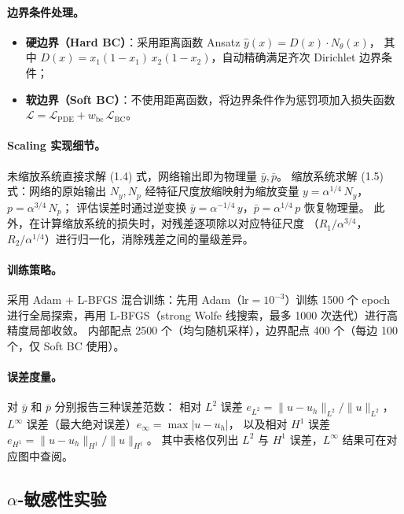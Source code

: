 \paragraph{边界条件处理。}
\begin{itemize}
  \item \textbf{硬边界（Hard BC）}：采用距离函数 Ansatz
        $\hat{y}(x) = D(x)\cdot N_\theta(x)$，
        其中 $D(x) = x_1(1-x_1)\,x_2(1-x_2)$，自动精确满足齐次 Dirichlet 边界条件；
  \item \textbf{软边界（Soft BC）}：不使用距离函数，将边界条件作为惩罚项加入损失函数
        $\mathcal{L} = \mathcal{L}_{\mathrm{PDE}} + w_{\mathrm{bc}}\,\mathcal{L}_{\mathrm{BC}}$。
\end{itemize}

\paragraph{Scaling 实现细节。}
未缩放系统直接求解 (1.4) 式，网络输出即为物理量 $\bar{y},\bar{p}$。
缩放系统求解 (1.5) 式：网络的原始输出 $N_y, N_p$ 经特征尺度放缩映射为缩放变量
$y = \alpha^{1/4}\,N_y$，$p = \alpha^{3/4}\,N_p$；
评估误差时通过逆变换 $\bar{y} = \alpha^{-1/4}\,y$，$\bar{p} = \alpha^{1/4}\,p$
恢复物理量。
此外，在计算缩放系统的损失时，对残差逐项除以对应特征尺度
（$R_1/\alpha^{3/4}$，$R_2/\alpha^{1/4}$）进行归一化，消除残差之间的量级差异。

\paragraph{训练策略。}
采用 Adam + L-BFGS 混合训练：先用 Adam（$\mathrm{lr}=10^{-3}$）训练 1500 个 epoch
进行全局探索，再用 L-BFGS（strong Wolfe 线搜索，最多 1000 次迭代）进行高精度局部收敛。
内部配点 2500 个（均匀随机采样），边界配点 400 个（每边 100 个，仅 Soft BC 使用）。

\paragraph{误差度量。}
对 $\bar{y}$ 和 $\bar{p}$ 分别报告三种误差范数：
相对 $L^2$ 误差 $e_{L^2} = \|u - u_h\|_{L^2}\big/\|u\|_{L^2}$，
$L^\infty$ 误差（最大绝对误差）$e_\infty = \max|u - u_h|$，
以及相对 $H^1$ 误差 $e_{H^1} = \|u - u_h\|_{H^1}\big/\|u\|_{H^1}$。
其中表格仅列出 $L^2$ 与 $H^1$ 误差，$L^\infty$ 结果可在对应图中查阅。


\subsection{$\alpha$-敏感性实验}
\label{subsec:alpha-test}

